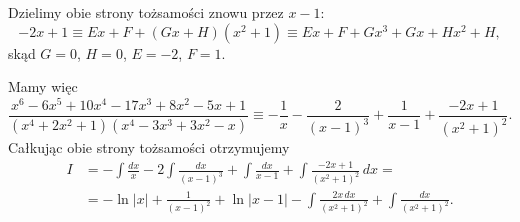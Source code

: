 \documentclass{article}
\begin{document}
 Dzielimy obie strony tożsamości znowu przez \(x-1\):
\[
-2x + 1 \equiv E x + F + (G x + H)(x^2 + 1) \equiv E x + F + G x^3 + G x + H x^2 + H,
\]
skąd \(G = 0\), \(H = 0\), \(E = -2\), \(F = 1\).

Mamy więc
\[
\frac{x^6 - 6x^5 + 10x^4 - 17x^3 + 8x^2 - 5x + 1}{(x^4 + 2x^2 + 1)(x^4 - 3x^3 + 3x^2 - x)} \equiv -\frac{1}{x} - \frac{2}{(x - 1)^3} + \frac{1}{x - 1} + \frac{-2x + 1}{(x^2 + 1)^2}.
\]
Całkując obie strony tożsamości otrzymujemy
\begin{align*}
I &= -\int \frac{dx}{x} - 2 \int \frac{dx}{(x - 1)^3} + \int \frac{dx}{x - 1} + \int \frac{-2x + 1}{(x^2 + 1)^2} \, dx= \\
&= -\ln |x| + \frac{1}{(x - 1)^2} + \ln |x - 1| - \int \frac{2x \, dx}{(x^2 + 1)^2} + \int \frac{dx}{(x^2 + 1)^2}.
\end{align*}
\end{document}
